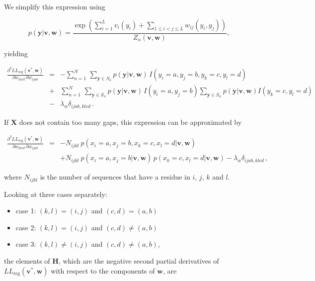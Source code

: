\documentclass[12pt,a4paper,twoside]{book}
\providecommand{\tightlist}{%
  \setlength{\itemsep}{0pt}\setlength{\parskip}{0pt}}
\newcommand{\eq}{\!=\!}
\renewcommand{\H}{\mathbf{H}}
\newcommand{\LLreg}{L\!L_\mathrm{reg}}
\newcommand{\Sn}{S_n}
\renewcommand{\v}{\mathbf{v}}
\newcommand{\w}{\mathbf{w}}
\newcommand{\wijab}{w_{ijab}}
\newcommand{\wklcd}{w_{klcd}}
\newcommand{\X}{\mathbf{X}}
\theoremstyle{definition}
\theoremstyle{definition}
\theoremstyle{remark}
\begin{document}
We simplify this expression using

\begin{equation}
    p(\mathbf{y} | \v,\w) = \frac{\exp \left( \sum_{i=1}^L v_i(y_i) + \sum_{1 \le i < j \le L} w_{ij}(y_i,y_j) \right)}{Z_n(\v,\w)}  ,
\end{equation}

yielding

\begin{eqnarray}
    \frac{\partial^2 \LLreg(\v^*,\w)}{\partial \wklcd \, \partial \wijab} 
    &=&  -  \sum_{n=1}^{N} \, \sum_{\mathbf{y} \in \Sn} p(\mathbf{y} | \v,\w) \, I(y_i \eq a, y_j \eq b, y_k \eq c, y_l \eq d)  \\
    &+& \sum_{n=1}^{N} \, \sum_{\mathbf{y} \in \mathcal{S}_n} p(\mathbf{y} | \v,\w) \, I(y_i \eq a, y_j \eq b ) \sum_{\mathbf{y} \in \Sn} p(\mathbf{y} | \v,\w)  I(y_k \eq c, y_l \eq d ) \\
    &-& \lambda_w \delta_{ijab,klcd} \,.
\end{eqnarray}

If \(\X\) does not contain too many gaps, this expression can be
approximated by

\begin{eqnarray}
    \frac{\partial^2 \LLreg(\v^*,\w)}{\partial \wklcd \, \partial \wijab  } 
    &=& - N_{ijkl} \: p(x_i \eq a, x_j \eq b, x_k \eq c, x_l \eq d | \v,\w)  \nonumber \\
    && +  N_{ijkl} \: p(x_i \eq a, x_j \eq b | \v,\w) \, p(x_k \eq c, x_l \eq d | \v,\w) - \lambda_w \delta_{ijab,klcd} \,,
\end{eqnarray}

where \(N_{ijkl}\) is the number of sequences that have a residue in
\(i\), \(j\), \(k\) and \(l\).

Looking at three cases separately:

\begin{itemize}
\tightlist
\item
  case 1: \((k,l) = (i,j)\) and \((c,d) = (a,b)\)
\item
  case 2: \((k,l) = (i,j)\) and \((c,d) \ne (a,b)\)
\item
  case 3: \((k,l) \ne (i,j)\) and \((c,d) \ne (a,b)\),
\end{itemize}

the elements of \(\H\), which are the negative second partial
derivatives of \(\LLreg(\v^*,\w)\) with respect to the components of
\(\w\), are
\end{document}
